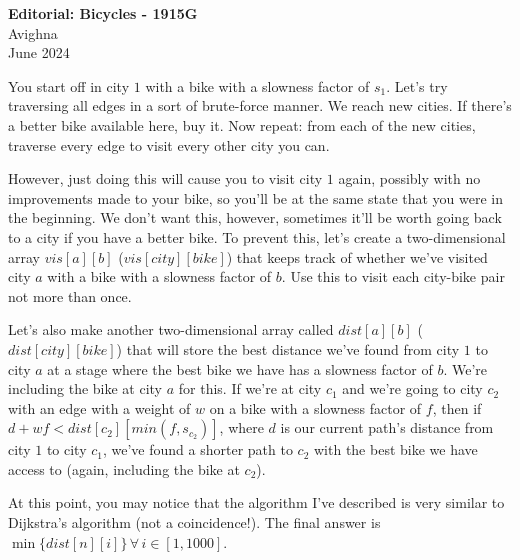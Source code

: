\documentclass{article}
\begin{document}
\begin{center}
  \large{\textbf{Editorial: Bicycles - 1915G}}\\
  \vspace{0.2em}
  \large{Avighna}\\
  \vspace{0.2em}
  \large{June 2024}
\end{center}

You start off in city $1$ with a bike with a slowness factor of $s_1$. Let's try traversing all edges in a sort of brute-force manner. We reach new cities. If there's a better bike available here, buy it. Now repeat: from each of the new cities, traverse every edge to visit every other city you can.

However, just doing this will cause you to visit city $1$ again, possibly with no improvements made to your bike, so you'll be at the same state that you were in the beginning. We don't want this, however, sometimes it'll be worth going back to a city if you have a better bike. To prevent this, let's create a two-dimensional array $vis[a][b]$ ($vis[city][bike]$) that keeps track of whether we've visited city $a$ with a bike with a slowness factor of $b$. Use this to visit each city-bike pair not more than once.

Let's also make another two-dimensional array called $dist[a][b]$ ($dist[city][bike]$) that will store the best distance we've found from city $1$ to city $a$ at a stage where the best bike we have has a slowness factor of $b$. We're including the bike at city $a$ for this. If we're at city $c_1$ and we're going to city $c_2$ with an edge with a weight of $w$ on a bike with a slowness factor of $f$, then if $d + wf < dist[c_2][min(f,s_{c_2})]$, where $d$ is our current path's distance from city $1$ to city $c_1$, we've found a shorter path to $c_2$ with the best bike we have access to (again, including the bike at $c_2$).

At this point, you may notice that the algorithm I've described is very similar to Dijkstra's algorithm (not a coincidence!). The final answer is $\min\{dist[n][i]\} \, \forall \, i \in [1,1000]$.
\end{document}
